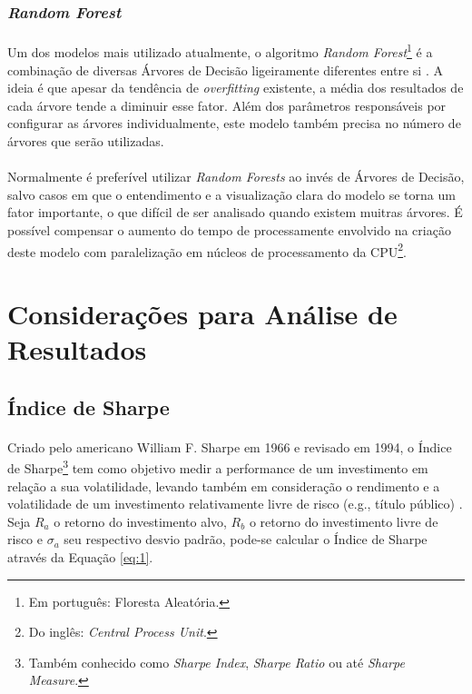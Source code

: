 \subsubsection*{\textit{Random Forest}}

\paragraph{} Um dos modelos mais utilizado atualmente, o algoritmo \textit{Random Forest}\footnote{Em português: Floresta Aleatória.} é a combinação de diversas Árvores de Decisão ligeiramente diferentes entre si \cite{muller2016introduction}. A ideia é que apesar da tendência de \textit{overfitting} existente, a média dos resultados de cada árvore tende a diminuir esse fator. Além dos parâmetros responsáveis por configurar as árvores individualmente, este modelo também precisa no número de árvores que serão utilizadas.

\paragraph{} Normalmente é preferível utilizar \textit{Random Forests} ao invés de Árvores de Decisão, salvo casos em que o entendimento e a visualização clara do modelo se torna um fator importante, o que difícil de ser analisado quando existem muitras árvores. É possível compensar o aumento do tempo de processamente envolvido na criação deste modelo com paralelização em núcleos de processamento da CPU\footnote{Do inglês: \textit{Central Process Unit}.}.

\section{Considerações para Análise de Resultados}

\subsection{Índice de Sharpe}

\paragraph{} Criado pelo americano William F. Sharpe em 1966 e revisado em 1994, o Índice de Sharpe\footnote{Também conhecido como \textit{Sharpe Index}, \textit{Sharpe Ratio} ou até \textit{Sharpe Measure}.} tem como objetivo medir a performance de um investimento em relação a sua volatilidade, levando também em consideração o rendimento e a volatilidade de um investimento relativamente livre de risco (e.g., título público) \cite{sharpe1998sharpe}. Seja \begin{math}R_a\end{math} o retorno do investimento alvo, \begin{math}R_b\end{math} o retorno do investimento livre de risco e \begin{math}\sigma_a\end{math} seu respectivo desvio padrão, pode-se calcular o Índice de Sharpe através da Equação \ref{eq:1}.

